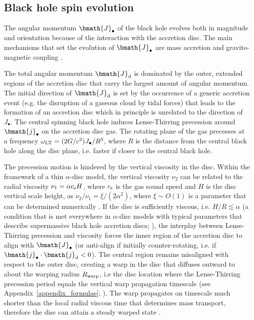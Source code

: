 \documentclass[a4paper,fleqn,usenatbib]{mnras}
\begin{document}
\subsection{Black hole spin evolution}\label{subsec_angmom}

The angular momentum $\bmath{J}_{\bullet}$ of the black hole evolves both in magnitude and orientation because of the interaction with the accretion disc.
The main mechanisms that set the evolution of $\bmath{J}_{\bullet}$ are mass accretion and gravito-magnetic coupling \citep{bardeen+75,scheuer+96}. 

The total angular momentum $\bmath{J}_{\rm d}$ is dominated by the outer, extended regions of the accretion disc that carry the largest amount of angular momentum.
The initial direction of $\bmath{J}_{\rm d}$ is set by the occurrence of a generic accretion event (e.g. the disruption of a gaseous cloud by tidal forces) that leads to the formation of an accretion disc which in principle is unrelated to the direction of $J_{\bullet}$.
The central spinning black hole induces Lense-Thirring precession around $\bmath{j}_{\bullet}$ on the accretion disc gas.
The rotating plane of the gas precesses at a frequency $\omega_{\rm LT} = (2G/c^2) J_{\bullet} / R^3$, where $R$ is the distance from the central black hole along the disc plane, i.e. faster if closer to the central black hole.

The precession motion is hindered by the vertical viscosity in the disc.
Within the framework of a thin $\alpha$-disc model, the vertical viscosity $\nu_2$ can be related to the radial viscosity $\nu_1 = \alpha c_{\rm s} H$, where $c_{\rm s}$ is the gas sound speed and $H$ is the disc vertical scale height, as $\nu_{2}/\nu_{1} = \xi / (2 \alpha^2)$, where $\xi \sim O(1)$ is a parameter that can be determined numerically \citep{papaloizou+83, lodato+07b}.
If the disc is sufficiently viscous, i.e. $H/R \lesssim \alpha$ (a condition that is met everywhere in $\alpha$-disc models with typical parameters that describe supermassive black hole accretion discs; \citealt{frank+02}), the interplay between Lense-Thirring precession and viscosity forces the inner region of the accretion disc to align with $\bmath{J}_{\bullet}$ (or anti-align if initially counter-rotating, i.e. if $\bmath{j}_{\bullet} \cdot \bmath{j}_{\rm d} < 0$).
The central region remains misaligned with respect to the outer disc, creating a warp in the disc that diffuses outward to about the warping radius $R_{\rm warp}$, i.e the disc
location where the Lense-Thirring precession period equals the vertical warp propagation timescale (see Appendix~\ref{appendix_formulae}; \citealt{pringle+92, lodato+06, lodato+07b, martin+07, perego+09,dotti+13}).
The warp propagates on timescale much shorter than the local radial viscous time that determines mass transport, therefore the disc can attain a steady warped state \citep{lodato+06, martin+07}.
\end{document}
